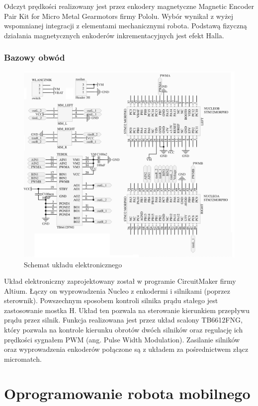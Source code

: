 \documentclass[eng,printmode]{mgr}
\begin{document}
Odczyt prędkości realizowany jest przez enkodery magnetyczne Magnetic Encoder Pair Kit for Micro Metal Gearmotors firmy Pololu. Wybór wynikał z wyżej wspomnianej integracji z elementami mechanicznymi robota. Podstawą fizyczną działania magnetycznych enkoderów inkrementacyjnych jest efekt Halla.

   \subsection{Bazowy obwód}
   \begin{figure}[ht]
    \centering
    \includegraphics[width=1\textwidth]{images/schemat_elekt}
    \caption{Schemat układu elektronicznego}
    \label{fig:schemat_elekt}
   \end{figure}

Układ elektroniczny zaprojektowany został w programie CircuitMaker firmy Altium. Łączy on wyprowadzenia Nucleo z enkodermi i silnikami (poprzez sterownik). Powszechnym sposobem kontroli silnika prądu stałego jest zastosowanie mostka H. Układ ten pozwala na sterowanie kierunkiem przepływu prądu przez silnik. Funkcja realizowana jest przez układ scalony TB6612FNG, który pozwala na kontrole kierunku obrotów dwóch silników oraz regulację ich prędkości sygnałem PWM (ang. Pulse Width Modulation). Zasilanie silników oraz wyprowadzenia enkoderów połączone są z układem za pośrednictwem złącz micromatch.
\chapter{Oprogramowanie robota mobilnego}
\end{document}
